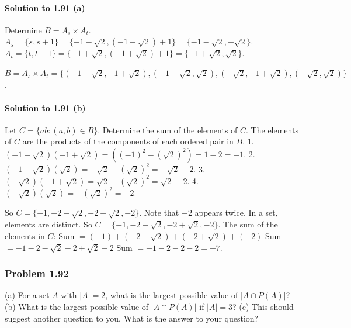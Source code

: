\documentclass{article}
\begin{document}
\begin{itemize}
\begin{itemize}
\begin{itemize}
\paragraph*{Solution to 1.91 (a)}
Determine $B = A_s \times A_t$.
$A_s = \{s, s+1\} = \{-1 - \sqrt{2}, (-1 - \sqrt{2}) + 1\} = \{-1 - \sqrt{2}, -\sqrt{2}\}$.
$A_t = \{t, t+1\} = \{-1 + \sqrt{2}, (-1 + \sqrt{2}) + 1\} = \{-1 + \sqrt{2}, \sqrt{2}\}$.

$B = A_s \times A_t = \{(-1 - \sqrt{2}, -1 + \sqrt{2}), (-1 - \sqrt{2}, \sqrt{2}), (-\sqrt{2}, -1 + \sqrt{2}), (-\sqrt{2}, \sqrt{2})\}$.

\paragraph*{Solution to 1.91 (b)}
Let $C = \{ab : (a, b) \in B\}$. Determine the sum of the elements of $C$.
The elements of $C$ are the products of the components of each ordered pair in $B$.
1. $(-1 - \sqrt{2})(-1 + \sqrt{2}) = ((-1)^2 - (\sqrt{2})^2) = 1 - 2 = -1$.
2. $(-1 - \sqrt{2})(\sqrt{2}) = -\sqrt{2} - (\sqrt{2})^2 = -\sqrt{2} - 2$.
3. $(-\sqrt{2})(-1 + \sqrt{2}) = \sqrt{2} - (\sqrt{2})^2 = \sqrt{2} - 2$.
4. $(-\sqrt{2})(\sqrt{2}) = -(\sqrt{2})^2 = -2$.

So $C = \{-1, -2 - \sqrt{2}, -2 + \sqrt{2}, -2\}$.
Note that $-2$ appears twice. In a set, elements are distinct. So $C = \{-1, -2 - \sqrt{2}, -2 + \sqrt{2}, -2\}$.
The sum of the elements in $C$:
Sum $= (-1) + (-2 - \sqrt{2}) + (-2 + \sqrt{2}) + (-2)$
Sum $= -1 - 2 - \sqrt{2} - 2 + \sqrt{2} - 2$
Sum $= -1 - 2 - 2 - 2 = -7$.

\subsubsection*{Problem 1.92}
(a) For a set $A$ with $|A| = 2$, what is the largest possible value of $|A \cap P(A)|$?
(b) What is the largest possible value of $|A \cap P(A)|$ if $|A| = 3$?
(c) This should suggest another question to you. What is the answer to your question?


\end{itemize}
\end{itemize}
\end{itemize}
\end{document}
